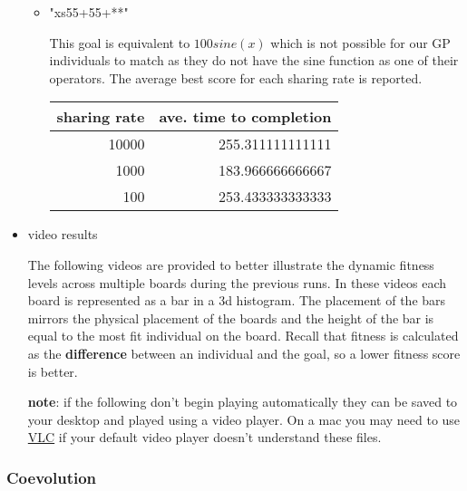 \documentclass[11pt]{article}
\begin{document}
\begin{itemize}
\begin{itemize}
\item "xs55+55+**"\\
\label{sec-1.5.3.2.3}

This goal is equivalent to $100 sine(x)$ which is not possible for our
GP individuals to match as they do not have the sine function as one
of their operators.  The average best score for each sharing rate is
reported.

\begin{center}
\begin{tabular}{rr}
 sharing rate  &  ave. time to completion  \\
\hline
        10000  &         255.311111111111  \\
         1000  &         183.966666666667  \\
          100  &         253.433333333333  \\
\end{tabular}
\end{center}



\end{itemize} %

\item video results\\
\label{sec-1.5.3.3}

The following videos are provided to better illustrate the dynamic
fitness levels across multiple boards during the previous runs.  In
these videos each board is represented as a bar in a 3d histogram.
The placement of the bars mirrors the physical placement of the boards
and the height of the bar is equal to the most fit individual on the
board.  Recall that fitness is calculated as the \textbf{difference} between
an individual and the goal, so a lower fitness score is better.

\textbf{note}: if the following don't begin playing automatically they can be
saved to your desktop and played using a video player.  On a mac you
may need to use \href{http://www.videolan.org/vlc/}{VLC} if your default video player doesn't understand
these files.


\end{itemize} %
\subsubsection*{Coevolution}
\label{sec-1.5.4}
\end{document}
